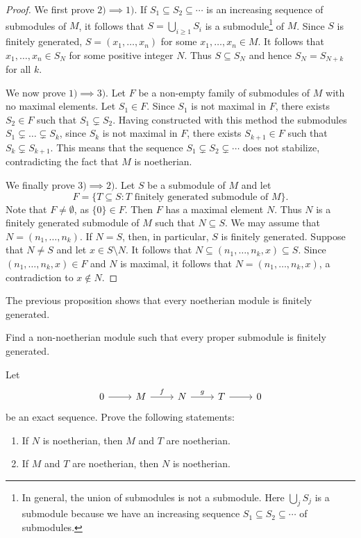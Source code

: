 \begin{proof}
	We first prove $2)\implies1)$. If $S_1\subseteq S_2\subseteq\cdots$ is an increasing 
        sequence of submodules of $M$, 
  it follows that $S=\bigcup_{i\geq 1}S_i$ is a submodule\footnote{In general,
  the union of submodules is not a submodule. Here $\bigcup_jS_j$ is a
submodule because we have an increasing sequence $S_1\subseteq
S_2\subseteq\cdots$ of submodules.} of $M$. Since $S$ is finitely generated,
$S=(x_1,\dots,x_n)$ for some $x_1,\dots,x_n\in M$. It follows that
$x_1,\dots,x_n\in S_N$ for some positive integer $N$. Thus $S\subseteq S_N$ and
hence $S_N=S_{N+k}$ for all $k$. 
	
	We now prove $1)\implies3)$. Let $F$ be a non-empty family of submodules of $M$ with no maximal elements. 
	Let $S_1\in F$. Since $S_1$ is not maximal in $F$, there exists $S_2\in F$ such that $S_1\subsetneq S_2$. 
	Having constructed with this method the submodules $S_1\subsetneq\dots\subsetneq S_k$, since $S_k$ is not
	maximal in $F$, there exists $S_{k+1}\in F$ such that $S_k\subsetneq S_{k+1}$. 
	This means that the sequence 
	$S_1\subsetneq S_2\subsetneq\cdots$ does not stabilize, contradicting 
  the fact that $M$ is noetherian.
	
	We finally prove $3)\implies2)$. Let $S$ be a submodule of $M$ and let 
	\[
	F=\{T\subseteq S:T\text{ finitely generated submodule of $M$}\}.
	\]
	Note that $F\ne\emptyset$, as $\{0\}\in F$. 
	Then $F$ has a maximal element $N$. Thus
	$N$ is a finitely generated submodule of $M$ such that $N\subseteq S$. We may assume that 
	$N=(n_1,\dots,n_k)$. If $N=S$, then, in particular, $S$ is finitely generated. Suppose that
	$N\ne S$ and let $x\in S\setminus N$. It follows that  
	$N\subseteq (n_1,\dots,n_k,x)\subseteq S$. Since 
	$(n_1,\dots,n_k,x)\in F$ and $N$ is maximal, it follows that 
	$N=(n_1,\dots,n_k,x)$, a contradiction
	to $x\not\in N$. 
\end{proof}

The previous proposition shows that every noetherian module is finitely
generated. 

\begin{exercise}
\label{xca:Prufer}
Find a non-noetherian module such that every proper submodule is finitely generated. 	
\end{exercise}

\begin{exercise}
\label{xca:exacta_noetheriano}
	Let   
\[\begin{tikzcd}
	0 & M & N & T & 0
	\arrow[from=1-1, to=1-2]
	\arrow["f", from=1-2, to=1-3]
	\arrow["g", from=1-3, to=1-4]
	\arrow[from=1-4, to=1-5]
\end{tikzcd}
\]
     be an exact sequence. Prove the following statements:
     \begin{enumerate}
     	\item If $N$ is noetherian, then $M$ and $T$ are noetherian.
     	\item If $M$ and $T$ are noetherian, then $N$ is noetherian.
     \end{enumerate}	
\end{exercise}

